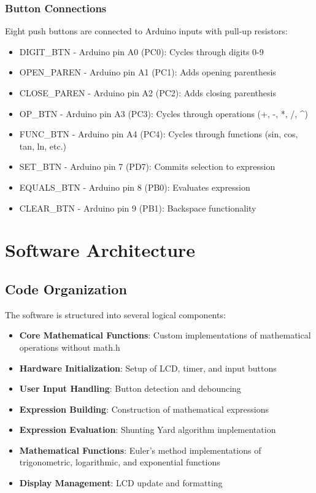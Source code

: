 \documentclass[12pt,a4paper]{article}
\begin{document}
\subsubsection{Button Connections}
Eight push buttons are connected to Arduino inputs with pull-up resistors:
\begin{itemize}
    \item DIGIT\_BTN - Arduino pin A0 (PC0): Cycles through digits 0-9
    \item OPEN\_PAREN - Arduino pin A1 (PC1): Adds opening parenthesis
    \item CLOSE\_PAREN - Arduino pin A2 (PC2): Adds closing parenthesis
    \item OP\_BTN - Arduino pin A3 (PC3): Cycles through operations (+, -, *, /, \^{})
    \item FUNC\_BTN - Arduino pin A4 (PC4): Cycles through functions (sin, cos, tan, ln, etc.)
    \item SET\_BTN - Arduino pin 7 (PD7): Commits selection to expression
    \item EQUALS\_BTN - Arduino pin 8 (PB0): Evaluates expression
    \item CLEAR\_BTN - Arduino pin 9 (PB1): Backspace functionality
\end{itemize}

\section{Software Architecture}

\subsection{Code Organization}

The software is structured into several logical components:

\begin{itemize}
    \item \textbf{Core Mathematical Functions}: Custom implementations of mathematical operations without math.h
    \item \textbf{Hardware Initialization}: Setup of LCD, timer, and input buttons
    \item \textbf{User Input Handling}: Button detection and debouncing
    \item \textbf{Expression Building}: Construction of mathematical expressions
    \item \textbf{Expression Evaluation}: Shunting Yard algorithm implementation
    \item \textbf{Mathematical Functions}: Euler's method implementations of trigonometric, logarithmic, and exponential functions
    \item \textbf{Display Management}: LCD update and formatting
\end{itemize}
\end{document}
